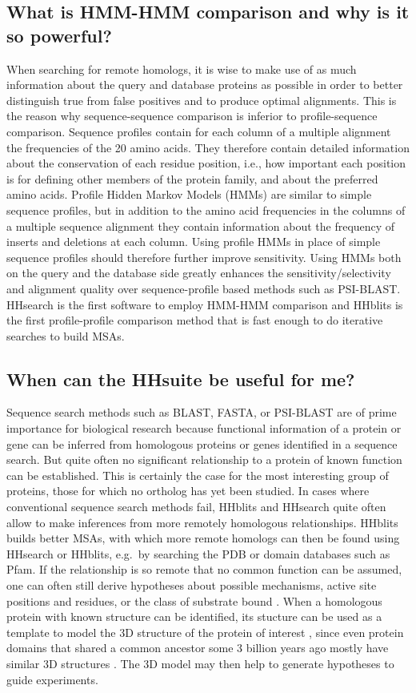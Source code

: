\documentclass[11pt,a4paper]{article}
\begin{document}
\subsection{What is HMM-HMM comparison and why is it so powerful?}
When searching for remote homologs, it is wise to make use of as much information about the query and database proteins as possible in order to better distinguish true from false positives and to produce optimal alignments. This is the reason why sequence-sequence comparison is inferior to profile-sequence comparison. Sequence profiles contain for each column of a multiple alignment the frequencies of the 20 amino acids. They therefore contain detailed information about the conservation of each residue position, i.e., how important each position is for defining other members of the protein family, and about the preferred amino acids. Profile Hidden Markov Models (HMMs) are similar to simple sequence profiles, but in addition to the amino acid frequencies in the columns of a multiple sequence alignment they contain information about the frequency of inserts and deletions at each column. Using profile HMMs in place of simple sequence profiles should therefore further improve sensitivity. Using HMMs both on the query and the database side greatly enhances the sensitivity/selectivity and alignment quality over sequence-profile based methods such as PSI-BLAST. HHsearch is the first software to employ HMM-HMM comparison and HHblits is the first profile-profile comparison method that is fast enough to do iterative searches to build MSAs. 

\subsection{When can the HHsuite be useful for me?}
Sequence search methods such as BLAST, FASTA, or PSI-BLAST are of prime importance for biological research because functional information of a protein or gene can be inferred from homologous proteins or genes identified in a sequence search. But quite often no significant relationship to a protein of known function can be established. This is certainly the case for the most interesting group of proteins, those for which no ortholog has yet been studied. In cases where conventional sequence search methods fail, HHblits and HHsearch quite often allow to make inferences from more remotely homologous relationships. HHblits builds better MSAs, with which more remote homologs can then be found using HHsearch or HHblits, e.g.\ by searching the PDB or domain databases such as Pfam. If the relationship is so remote that no common function can be assumed, one can often still derive hypotheses about possible mechanisms, active site positions and residues, or the class of substrate bound \cite{Todd:2001, Pawlowski:2000}. When a homologous protein with known structure can be identified, its stucture can be used as a template to model the 3D structure of the protein of interest \cite{Rychlewski:1998}, since even protein domains that shared a common ancestor some 3 billion years ago mostly have similar 3D structures \cite{Kinch:2002,Soding:2006a,Alva:2010}. The 3D model may then help to generate hypotheses to guide experiments. 
\end{document}
